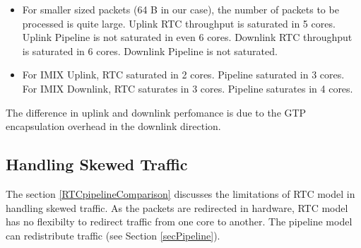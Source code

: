 \begin{itemize}
        \item For smaller sized packets (64 B in our case), the number of packets to be processed is quite large. Uplink RTC throughput is saturated in 5 cores. Uplink Pipeline is not saturated in even  6 cores. Downlink RTC throughput is saturated in 6 cores. Downlink Pipeline is not saturated.  
        \item For IMIX Uplink, RTC saturated in 2 cores. Pipeline saturated in 3 cores. For IMIX Downlink, RTC saturates in 3 cores. Pipeline saturates in 4 cores.
\end{itemize}
The difference in uplink and downlink perfomance is due to the GTP encapsulation overhead in the downlink direction.
\subsection{Handling Skewed Traffic \label{subsubsectionSkewedTraffic}}
The section \ref{RTCpipelineComparison} discusses the limitations of RTC model in handling skewed traffic. As the packets are redirected in hardware, RTC model has no flexibilty to redirect traffic from one core to another. 
The pipeline model can redistribute traffic (see Section \ref{secPipeline}).
